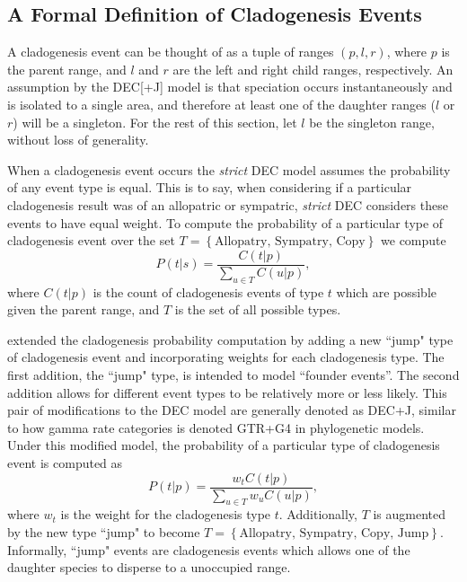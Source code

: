 \documentclass[a4paper]{article}
\begin{document}
\subsection{A Formal Definition of Cladogenesis Events}
\label{sec:formal-cladogenesis}

A cladogenesis event can be thought of as a tuple of ranges $(p, l, r)$, where $p$ is the parent range, and $l$ and $r$
are the left and right child ranges, respectively. 
An assumption by the DEC[+J] model is that speciation occurs instantaneously and is isolated to a single area, and
therefore at least one of the daughter ranges ($l$ or $r$) will be a singleton.
For the rest of this section, let $l$ be the singleton range, without loss of generality.

When a cladogenesis event occurs the \textit{strict} DEC model assumes the probability of any event type is equal.
This is to say, when considering if a particular cladogenesis result was of an allopatric or sympatric, \textit{strict}
DEC considers these events to have equal weight.
To compute the probability of a particular type of cladogenesis event over the set \(T = \left\{\text{Allopatry,
Sympatry, Copy}\right\}\) we compute
\[
	P(t |
	s) = \frac{C(t | p)}{\sum_{u \in T} C(u | p)},
\]
where \( C(t|p) \) is the count of cladogenesis events of type $t$ which are possible given the parent range, and $T$ is
the set of all possible types.

\citet{ModelSelectionMatzke2014} extended the cladogenesis probability computation by adding a new ``jump" type of
cladogenesis event and incorporating weights for each cladogenesis type.
The first addition, the ``jump" type, is intended to model ``founder events''.
The second addition allows for different event types to be relatively more or less likely.
This pair of modifications to the DEC model are generally denoted as DEC+J, similar to how gamma rate categories is
denoted GTR+G4 in phylogenetic models.
Under this modified model, the probability of a particular type of cladogenesis event is computed as
\begin{equation}
	P(t | p) = \frac{w_t C(t | p)}{\sum_{u \in T} w_u C(u | p)},
\end{equation}
where $w_t$ is the weight for the cladogenesis type $t$.
Additionally, $T$ is augmented by the new type ``jump" to become \(T = \left\{\text{Allopatry, Sympatry, Copy,
Jump}\right\} \).
Informally, ``jump" events are cladogenesis events which allows one of the daughter species to disperse to a unoccupied
range.
\end{document}
